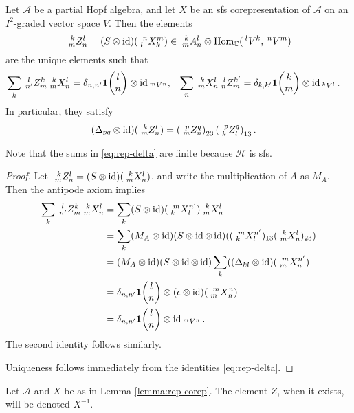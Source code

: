 \begin{Lem} \label{lemma:rep-corep} Let $\mathscr{A}$ be a partial Hopf algebra, and let $X$ be an sfs corepresentation of $\mathscr{A}$ on an $I^2$-graded vector space $V$.
  Then the elements %
  \[\Gr{Z}{k}{l}{m}{n} =(S \otimes
  \id)(\Gr{X}{n}{m}{l}{k}) \in
    \Gr{A}{k}{l}{m}{n} \otimes
    \Hom_\C(\Gru{V}{l}{k},\Gru{V}{n}{m})\] are the unique elements such  that
  \begin{align}\label{eq:rep-delta}
    \sum_{k} \Gr{Z}{l}{k}{n'}{m} \Gr{X}{k}{l}{m}{n} &= \delta_{n,n'}
    \UnitC{l}{n} \otimes \id_{\Gru{V}{m}{n}}, &
    \sum_{n} \Gr{X}{k}{l}{m}{n} \Gr{Z}{l}{k'}{n}{m} &= \delta_{k,k'}
    \UnitC{k}{m}\otimes \id_{\Gru{V}{k}{l}}.
  \end{align}
   In particular, they satisfy
  \begin{align*}
    (\Delta_{pq} \otimes \id)(\Gr{Z}{k}{l}{m}{n}) &=
    \left(\Gr{Z}{p}{q}{m}{n}\right)_{23}\left(\Gr{Z}{p}{q}{k}{l}\right)_{13}.
  \end{align*}
\end{Lem}
Note that the sums in \eqref{eq:rep-delta} are finite because $\mathcal{H}$ is sfs. 
\begin{proof}
 Let  $\Gr{Z}{k}{l}{m}{n}=(S \otimes \id)(\Gr{X}{k}{l}{m}{n})$, and write the multiplication of $A$ as $M_A$. Then the antipode axiom implies
   \begin{align*}
     \sum_{k} \Gr{Z}{l}{k}{n'}{m} \Gr{X}{k}{l}{m}{n} &= \sum_{k}
     (S\otimes \id)(\Gr{X}{m}{n'}{k}{l}) \Gr{X}{k}{l}{m}{n}
     \\
     &=\sum_{k} (M_A \otimes \id)(S\otimes \id \otimes \id) (
     (\Gr{X}{m}{n
       '}{k}{l})_{13}(\Gr{X}{k}{l}{m}{n})_{23}) \\
     &= (M_A\otimes \id)(S\otimes \id \otimes \id)\sum_{k}((\Delta_{kl}
     \otimes \id)(\Gr{X}{m}{n'}{m}{n}) \\
     &= \delta_{n,n'} \UnitC{l}{n}\otimes (\epsilon\otimes \id)(\Gr{X}{m}{n}{m}{n}) \\
     &= \delta_{n,n'}\UnitC{l}{n} \otimes 
     \id_{\Gru{V}{m}{n}}.
   \end{align*} The second identity follows
   similarly.

 Uniqueness follows immediately from the identities  \eqref{eq:rep-delta}.
\end{proof}

\begin{Def} Let $\mathscr{A}$ and $X$ be as in Lemma \ref{lemma:rep-corep}. The element $Z$, when it exists, will be denoted $X^{-1}$.
\end{Def} 

